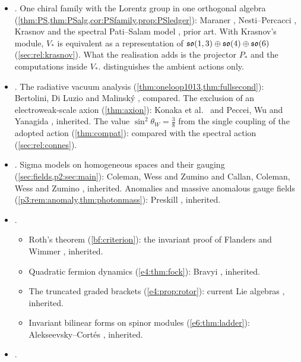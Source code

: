 \begin{itemize}[leftmargin=1.6em]
\begin{itemize}
  \end{itemize}
\item {}. One chiral family with the Lorentz group in one orthogonal algebra (\cref{thm:PS,thm:PSalg,cor:PSfamily,prop:PSledger}):
Maraner \cite{Maraner04}, Nesti--Percacci \cite{NestiPercacci10}, Krasnov \cite[\S\S6.4--6.7]{Krasnov18} and the spectral Pati--Salam
model \cite{ChamseddineConnesVanSuijlekom13}, prior art. With Krasnov's module, $V_*$ is equivalent as a representation of
$\mathfrak{so}(1,3)\oplus\mathfrak{so}(4)\oplus\mathfrak{so}(6)$ (\cref{sec:rel:krasnov}). What the realisation adds is the projector $P_*$ and the computations inside $V_*$.
 distinguishes the ambient actions only.
\item {}. The radiative vacuum analysis (\cref{thm:oneloop1013,thm:fullsecond}): Bertolini, Di Luzio and Malinsk\'y
\cite{BertoliniDiLuzioMalinsky10,BertoliniDiLuzioMalinsky12}, compared. The exclusion of an electroweak-scale axion (\cref{thm:axion}):
Konaka et al.\ \cite{Konaka86} and Peccei, Wu and Yanagida \cite{PecceiWuYanagida86}, inherited. The value $\sin^2\theta_W=\tfrac38$ from
the single coupling of the adopted action (\cref{thm:compat}): compared with the spectral action \cite{ChamseddineConnesMarcolli07}
(\cref{sec:rel:connes}).
\item {}. Sigma models on homogeneous spaces and their gauging (\cref{sec:fields,p2:sec:main}): Coleman, Wess and Zumino
and Callan, Coleman, Wess and Zumino \cite{ColemanWessZumino69,CallanColemanWessZumino69}, inherited. Anomalies and massive anomalous gauge
fields (\cref{p3:rem:anomaly,thm:photonmass}): Preskill \cite{Preskill91}, inherited.
\item {}.
  \begin{itemize}
  \item Roth's theorem (\cref{bf:criterion}): the invariant proof of Flanders and Wimmer \cite{FlandersWimmer77}, inherited.
  \item Quadratic fermion dynamics (\cref{e4:thm:fock}): Bravyi \cite{Bravyi05}, inherited.
  \item The truncated graded brackets (\cref{e4:prop:rotor}): current Lie algebras \cite{Zusmanovich10}, inherited.
  \item Invariant bilinear forms on spinor modules (\cref{e6:thm:ladder}): Alekseevsky--Cort\'es \cite{AlekseevskyCortes97}, inherited.
  \end{itemize}
\item {}.

\end{itemize}
